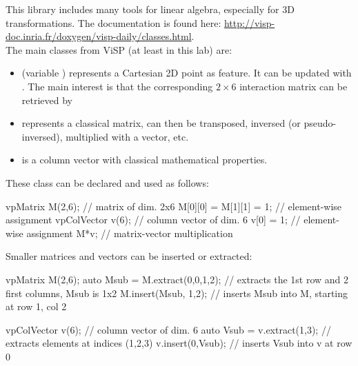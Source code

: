 \documentclass{ecnreport}
\begin{document}
This library includes many tools for linear algebra, especially for 3D transformations. 
The documentation is found here: \url{http://visp-doc.inria.fr/doxygen/visp-daily/classes.html}.\\
The main classes from ViSP (at least in this lab) are:
\begin{itemize}
\item {} (variable ) represents a Cartesian 2D point as feature. It can be updated with . The main interest is that the corresponding $2\times 6$ interaction matrix can be retrieved by 
\item {} represents a classical matrix, can then be transposed, inversed (or pseudo-inversed), multiplied with a vector, etc.
\item {} is a column vector with classical mathematical properties.
\end{itemize}
These class can be declared and used as follows:
\begin{cppcode}
       vpMatrix M(2,6); 	// matrix of dim. 2x6
       M[0][0] = M[1][1] = 1;	// element-wise assignment
       vpColVector v(6);	// column vector of dim. 6
       v[0] = 1;		// element-wise assignment
       M*v;			// matrix-vector multiplication
\end{cppcode}

Smaller matrices and vectors can be inserted or extracted:

\begin{cppcode}
       vpMatrix M(2,6);
       auto Msub = M.extract(0,0,1,2);     // extracts the 1st row and 2 first columns, Msub is 1x2
       M.insert(Msub, 1,2);                // inserts Msub into M, starting at row 1, col 2

       vpColVector v(6);	// column vector of dim. 6
       auto Vsub = v.extract(1,3); // extracts elements at indices (1,2,3)
       v.insert(0,Vsub);                  // inserts Vsub into v at row 0
\end{cppcode}
\end{document}
